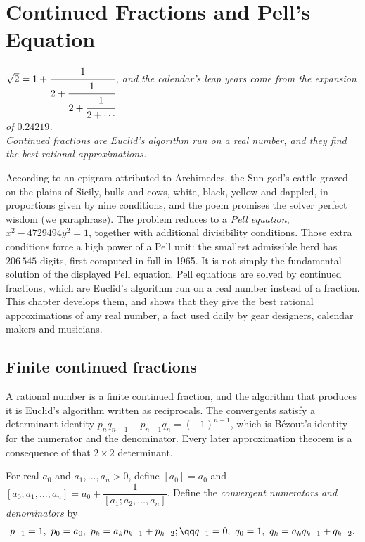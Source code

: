 \chapter{Continued Fractions and Pell's Equation}\label{ch:continued}

\begin{center}\itshape
$\sqrt2=1+\cfrac1{2+\cfrac1{2+\cfrac1{2+\cdots}}}$, and the calendar's leap years come from the expansion of $0.24219$.\\
Continued fractions are Euclid's algorithm run on a real number, and they find the best rational approximations.
\end{center}

According to an epigram attributed to Archimedes, the Sun god's cattle grazed on the plains of Sicily, bulls and cows, white, black, yellow and dappled,
in proportions given by nine conditions, and the poem promises the solver perfect wisdom (we paraphrase). The problem reduces to a
\emph{Pell equation}, $x^2-4729494y^2=1$, together with additional divisibility conditions. Those extra conditions force a high power of a Pell unit: the smallest admissible herd has $206\,545$ digits, first computed in full in 1965. It is not simply the fundamental solution of the displayed Pell equation. Pell
equations are solved by continued fractions, which are Euclid's algorithm run on a real number instead of a fraction. This chapter develops them, and
shows that they give the best rational approximations of any real number, a fact used daily by gear designers, calendar makers and musicians.

\section{Finite continued fractions}

A rational number is a finite continued fraction, and the algorithm that produces it is Euclid's algorithm written as reciprocals. The convergents satisfy a determinant identity $p_nq_{n-1}-p_{n-1}q_n=(-1)^{n-1}$, which is Bézout's identity for the numerator and the denominator. Every later approximation theorem is a consequence of that $2\times 2$ determinant.

For real $a_0$ and $a_1,\dots,a_n>0$, define $[a_0]=a_0$ and $[a_0;a_1,\dots,a_n]=a_0+\dfrac1{[a_1;a_2,\dots,a_n]}$. Define the \emph{convergent numerators and denominators} by
\[
\begin{gathered}p_{-1}=1,\ p_0=a_0,\ p_k=a_kp_{k-1}+p_{k-2};\qq q_{-1}=0,\ q_0=1,\ q_k=a_kq_{k-1}+q_{k-2}.\end{gathered}
\]


